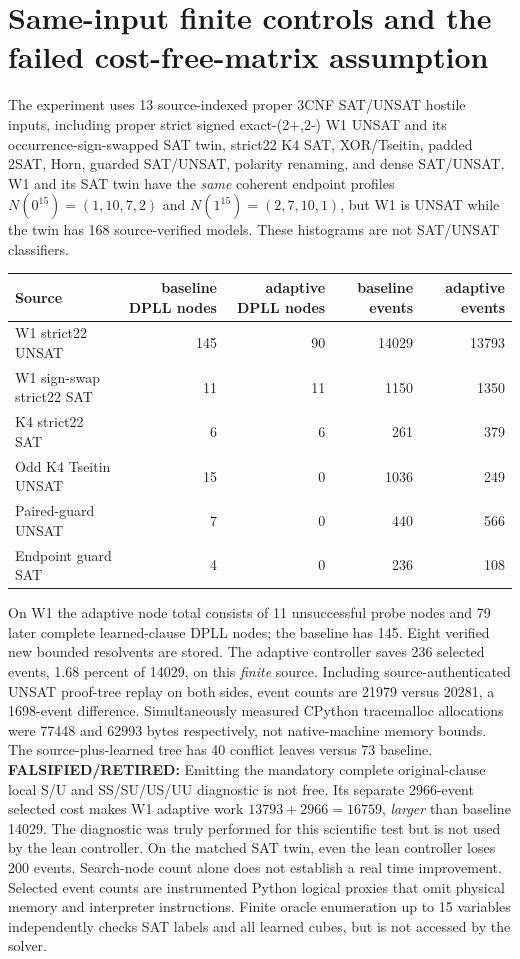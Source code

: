 \documentclass[11pt]{article}
\begin{document}
\section{Same-input finite controls and the failed cost-free-matrix assumption}
The experiment uses 13 source-indexed proper 3CNF SAT/UNSAT hostile inputs, including proper strict signed exact-(2+,2-) W1 UNSAT and its occurrence-sign-swapped SAT twin, strict22 K4 SAT, XOR/Tseitin, padded 2SAT, Horn, guarded SAT/UNSAT, polarity renaming, and dense SAT/UNSAT. W1 and its SAT twin have the \emph{same} coherent endpoint profiles $N(0^{15})=(1,10,7,2)$ and $N(1^{15})=(2,7,10,1)$, but W1 is UNSAT while the twin has 168 source-verified models. These histograms are not SAT/UNSAT classifiers.
\begin{center}\begin{tabular}{lrrrr}\toprule
Source & baseline DPLL nodes & adaptive DPLL nodes & baseline events & adaptive events\\\midrule
W1 strict22 UNSAT&145&90&14029&13793\\
W1 sign-swap strict22 SAT&11&11&1150&1350\\
K4 strict22 SAT&6&6&261&379\\
Odd K4 Tseitin UNSAT&15&0&1036&249\\
Paired-guard UNSAT&7&0&440&566\\
Endpoint guard SAT&4&0&236&108\\\bottomrule
\end{tabular}\end{center}
On W1 the adaptive node total consists of 11 unsuccessful probe nodes and 79 later complete learned-clause DPLL nodes; the baseline has 145. Eight verified new bounded resolvents are stored. The adaptive controller saves 236 selected events, 1.68 percent of 14029, on this \emph{finite} source. Including source-authenticated UNSAT proof-tree replay on both sides, event counts are 21979 versus 20281, a 1698-event difference. Simultaneously measured CPython tracemalloc allocations were 77448 and 62993 bytes respectively, not native-machine memory bounds. The source-plus-learned tree has 40 conflict leaves versus 73 baseline.
\textbf{FALSIFIED/RETIRED:} Emitting the mandatory complete original-clause local S/U and SS/SU/US/UU diagnostic is not free. Its separate 2966-event selected cost makes W1 adaptive work $13793+2966=16759$, \emph{larger} than baseline 14029. The diagnostic was truly performed for this scientific test but is not used by the lean controller. On the matched SAT twin, even the lean controller loses 200 events. Search-node count alone does not establish a real time improvement. Selected event counts are instrumented Python logical proxies that omit physical memory and interpreter instructions. Finite oracle enumeration up to 15 variables independently checks SAT labels and all learned cubes, but is not accessed by the solver.
\end{document}
